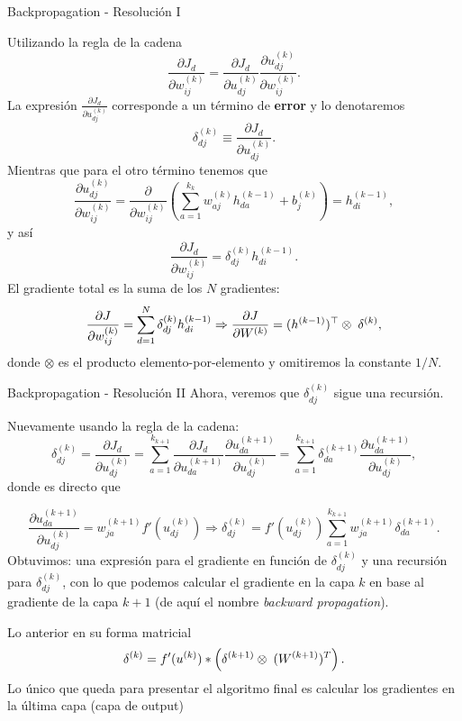 \documentclass[handout, 9pt]{beamer}
\begin{document}
\begin{frame}{Backpropagation - Resolución I}

Utilizando la regla de la cadena 
\[
\frac{\partial J_d}{\partial w_{ij}^{(k)}} = \frac{\partial J_d}{\partial u_{dj}^{(k)}}\frac{\partial u_{dj}^{(k)}}{\partial w_{ij}^{(k)}}.
\] \pause
La expresión $\frac{\partial J_d}{\partial u_{dj}^{(k)}}$ corresponde a un término de \textbf{error} y lo denotaremos \
\[
\delta_{dj}^{(k)} \equiv \frac{\partial J_d}{\partial u_{dj}^{(k)}}.
\] \pause
Mientras que para el otro término tenemos que 
\[
\frac{\partial u_{dj}^{(k)}}{\partial w_{ij}^{(k)}} = \frac{\partial}{\partial w_{ij}^{(k)}} \left ( \sum_{a = 1}^{k_k}w_{aj}^{(k)}h_{da}^{(k-1)} + b_j^{(k)} \right) = h_{di}^{(k-1)},
\] \pause
y así 
\[
\frac{\partial J_d}{\partial w_{ij}^{(k)}} = \delta_{dj}^{(k)}  h_{di}^{(k-1)}.
\] \pause
El gradiente total es la suma de los $N$ gradientes:
\[\frac{\partial J}{\partial w_{ij}^{(k)}} = \sum_{d=1}^N \delta_{dj}^{(k)}  h_{di}^{(k-1)}  \Rightarrow  \frac{\partial J}{\partial W^{(k)}} = (h^{(k-1)})^\top \otimes \hspace{0.1cm} \delta^{(k)},
\]
donde $\otimes$ es el producto elemento-por-elemento y omitiremos la constante $1/N$.
\end{frame}


\begin{frame}{Backpropagation - Resolución II}
Ahora, veremos que $\delta_{dj}^{(k)}$ sigue una recursión. 

Nuevamente usando la regla de la cadena: \pause
\[
\delta_{dj}^{(k)} = \frac{\partial J_d}{\partial u_{dj}^{(k)}} = \sum_{a=1}^{k_{k+1}} \frac{\partial J_d}{\partial u_{da}^{(k+1)}} \frac{\partial u_{da}^{(k+1)}}{\partial u_{dj}^{(k)}} = \sum_{a=1}^{k_{k+1}} \delta_{da}^{(k+1)} \frac{\partial u_{da}^{(k+1)}}{\partial u_{dj}^{(k)}}, 
\] 
\pause 
donde es directo que

\[
\frac{\partial u_{da}^{(k+1)}}{\partial u_{dj}^{(k)}} = w_{ja}^{(k+1)}f'(u_{dj}^{(k)})  \Rightarrow  \delta_{dj}^{(k)} = f'(u_{dj}^{(k)})\sum_{a=1}^{k_{k+1}}w_{ja}^{(k+1)}\delta_{da}^{(k+1)}.
\]
\pause
Obtuvimos: una expresión para el gradiente en función de $\delta_{dj}^{(k)}$ y una recursión para $\delta_{dj}^{(k)}$, con lo que podemos calcular el gradiente en la capa $k$ en base al gradiente de la capa $k+1$ (de aquí el nombre \emph{backward propagation}).
\newline \pause

Lo anterior en su forma matricial
\[
\delta^{(k)} = f'(u^{(k)}) * \left ( \delta^{(k+1)} \otimes  \hspace{0.1cm} (W^{(k+1)})^T \right ).
\] \pause
Lo único que queda para presentar el algoritmo final es calcular los gradientes en la última capa (capa de output)

\end{frame}
\end{document}
